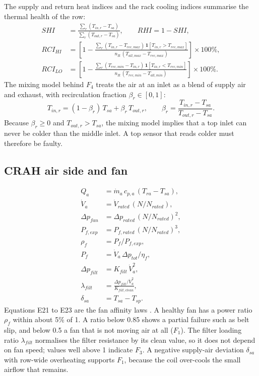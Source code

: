 The supply and return heat indices \parencite{sharma2002} and the rack cooling indices \parencite{herrlin2005} summarise the thermal health of the row:
\begin{align}
  \mathit{SHI} &= \frac{\sum_r (T_{in,r} - T_{sa})}{\sum_r (T_{out,r} - T_{sa})} , \qquad \mathit{RHI} = 1 - \mathit{SHI} , \tag{E14--E15}\\
  \mathit{RCI}_{HI} &= \left[1 - \frac{\sum_r (T_{in,r} - T_{rec,max})\,\mathbf{1}[T_{in,r} > T_{rec,max}]}{n_R\,(T_{all,max} - T_{rec,max})}\right] \times 100\% , \tag{E16}\\
  \mathit{RCI}_{LO} &= \left[1 - \frac{\sum_r (T_{rec,min} - T_{in,r})\,\mathbf{1}[T_{in,r} < T_{rec,min}]}{n_R\,(T_{rec,min} - T_{all,min})}\right] \times 100\% . \tag{E17}
\end{align}
The mixing model behind $F_4$ treats the air at an inlet as a blend of supply air and exhaust, with recirculation fraction $\beta_r \in [0,1]$:
\begin{equation}
  T_{in,r} = (1 - \beta_r)\, T_{sa} + \beta_r\, T_{out,r} , \qquad
  \beta_r = \frac{T_{in,r} - T_{sa}}{T_{out,r} - T_{sa}} . \tag{E18--E19}\label{eq:mixing}
\end{equation}
Because $\beta_r \ge 0$ and $T_{out,r} > T_{sa}$, the mixing model implies that a top inlet can never be colder than the middle inlet. A top sensor that reads colder must therefore be faulty.

\subsection{CRAH air side and fan}

\begin{align}
  Q_a &= \dot m_a\, c_{p,a}\, (T_{ra} - T_{sa}) , \tag{E20}\\
  \dot V_a &= \dot V_{rated}\,(N / N_{rated}) , \tag{E21}\\
  \Delta p_{fan} &= \Delta p_{rated}\,(N / N_{rated})^2 , \tag{E22}\\
  P_{f,exp} &= P_{f,rated}\,(N / N_{rated})^3 , \tag{E23}\\
  \rho_f &= P_f / P_{f,exp} , \tag{E24}\\
  P_f &= \dot V_a\, \Delta p_{tot} / \eta_f , \tag{E25}\\
  \Delta p_{filt} &= K_{filt}\, \dot V_a^2 , \tag{E26}\\
  \lambda_{filt} &= \frac{\Delta p_{filt} / \dot V_a^2}{K_{filt,clean}} , \tag{E27}\\
  \delta_{sa} &= T_{sa} - T_{sp} . \tag{E28}
\end{align}
Equations E21 to E23 are the fan affinity laws \parencite{ashraehvac2020}. A healthy fan has a power ratio $\rho_f$ within about 5\% of 1. A ratio below 0.85 shows a partial failure such as belt slip, and below 0.5 a fan that is not moving air at all ($F_1$). The filter loading ratio $\lambda_{filt}$ normalises the filter resistance by its clean value, so it does not depend on fan speed; values well above 1 indicate $F_3$. A negative supply-air deviation $\delta_{sa}$ with row-wide overheating supports $F_1$, because the coil over-cools the small airflow that remains.


